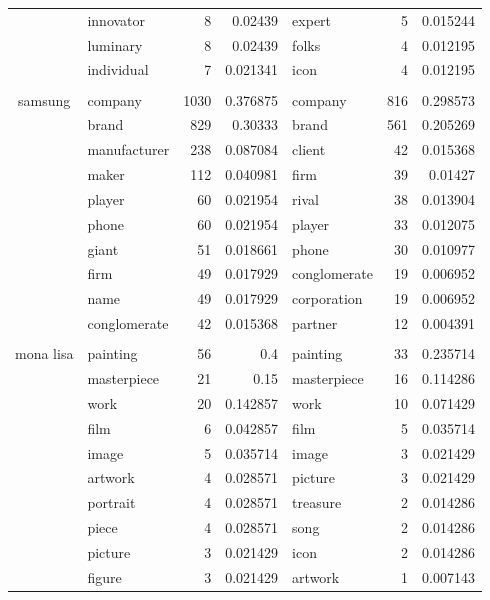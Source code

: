 \begin{table*}[htbp!]
\begin{tabular}{llrrlrr}
    \multicolumn{1}{c}{} & innovator & 8     & 0.02439 & expert & 5     & 0.015244 \\
    \multicolumn{1}{c}{} & luminary & 8     & 0.02439 & folks & 4     & 0.012195 \\
    \multicolumn{1}{c}{} & individual & 7     & 0.021341 & icon  & 4     & 0.012195 \\
          &       &       &       &       &       &  \\
    \multicolumn{1}{c}{\multirow{10}[0]{*}{samsung}} & company & 1030  & 0.376875 & company & 816   & 0.298573 \\
    \multicolumn{1}{c}{} & brand & 829   & 0.30333 & brand & 561   & 0.205269 \\
    \multicolumn{1}{c}{} & manufacturer & 238   & 0.087084 & client & 42    & 0.015368 \\
    \multicolumn{1}{c}{} & maker & 112   & 0.040981 & firm  & 39    & 0.01427 \\
    \multicolumn{1}{c}{} & player & 60    & 0.021954 & rival & 38    & 0.013904 \\
    \multicolumn{1}{c}{} & phone & 60    & 0.021954 & player & 33    & 0.012075 \\
    \multicolumn{1}{c}{} & giant & 51    & 0.018661 & phone & 30    & 0.010977 \\
    \multicolumn{1}{c}{} & firm  & 49    & 0.017929 & conglomerate & 19    & 0.006952 \\
    \multicolumn{1}{c}{} & name  & 49    & 0.017929 & corporation & 19    & 0.006952 \\
    \multicolumn{1}{c}{} & conglomerate & 42    & 0.015368 & partner & 12    & 0.004391 \\
          &       &       &       &       &       &  \\
    \multicolumn{1}{c}{\multirow{10}[0]{*}{mona lisa}} & painting & 56    & 0.4   & painting & 33    & 0.235714 \\
    \multicolumn{1}{c}{} & masterpiece & 21    & 0.15  & masterpiece & 16    & 0.114286 \\
    \multicolumn{1}{c}{} & work  & 20    & 0.142857 & work  & 10    & 0.071429 \\
    \multicolumn{1}{c}{} & film  & 6     & 0.042857 & film  & 5     & 0.035714 \\
    \multicolumn{1}{c}{} & image & 5     & 0.035714 & image & 3     & 0.021429 \\
    \multicolumn{1}{c}{} & artwork & 4     & 0.028571 & picture & 3     & 0.021429 \\
    \multicolumn{1}{c}{} & portrait & 4     & 0.028571 & treasure & 2     & 0.014286 \\
    \multicolumn{1}{c}{} & piece & 4     & 0.028571 & song  & 2     & 0.014286 \\
    \multicolumn{1}{c}{} & picture & 3     & 0.021429 & icon  & 2     & 0.014286 \\
    \multicolumn{1}{c}{} & figure & 3     & 0.021429 & artwork & 1     & 0.007143 \\
    \bottomrule
    \end{tabular}%
  \label{tab:rerank}%
\end{table*}%
